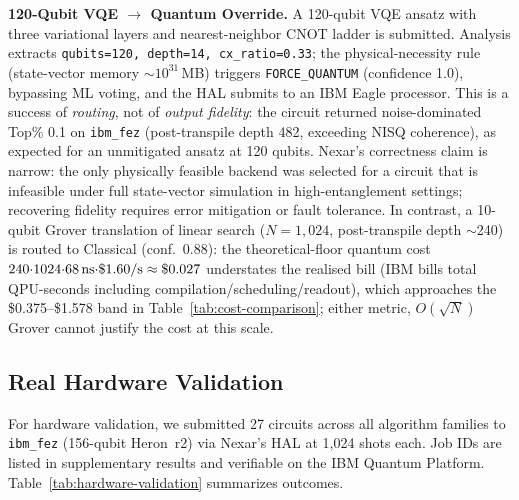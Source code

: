 \documentclass[10pt,conference]{IEEEtran}
\begin{document}
\textbf{120-Qubit VQE $\rightarrow$ Quantum Override.} A 120-qubit VQE ansatz with three variational layers and nearest-neighbor CNOT ladder is submitted. Analysis extracts \texttt{qubits=120, depth=14, cx\_ratio=0.33}; the physical-necessity rule (state-vector memory $\sim$$10^{31}$\,MB) triggers \texttt{FORCE\_QUANTUM} (confidence 1.0), bypassing ML voting, and the HAL submits to an IBM Eagle processor. This is a success of \emph{routing}, not of \emph{output fidelity}: the circuit returned noise-dominated Top\% 0.1 on \texttt{ibm\_fez} (post-transpile depth 482, exceeding NISQ coherence), as expected for an unmitigated ansatz at 120 qubits. Nexar's correctness claim is narrow: the only physically feasible backend was selected for a circuit that is infeasible under full state-vector simulation in high-entanglement settings; recovering fidelity requires error mitigation \cite{temme2017} or fault tolerance. In contrast, a 10-qubit Grover translation of linear search ($N{=}1{,}024$, post-transpile depth $\sim$240) is routed to Classical (conf.\ 0.88): the theoretical-floor quantum cost $240{\cdot}1024{\cdot}68\text{\,ns}{\cdot}\$1.60/\text{s}\approx\$0.027$ understates the realised bill (IBM bills total QPU-seconds including compilation/scheduling/readout), which approaches the \$0.375--\$1.578 band in Table~\ref{tab:cost-comparison}; either metric, $O(\sqrt{N})$ Grover cannot justify the cost at this scale.

\subsection{Real Hardware Validation}

For hardware validation, we submitted 27 circuits across all algorithm families to \texttt{ibm\_fez} (156-qubit Heron~r2) via Nexar's HAL at 1{,}024 shots each. Job IDs are listed in supplementary results and verifiable on the IBM Quantum Platform. Table~\ref{tab:hardware-validation} summarizes outcomes.
\end{document}
